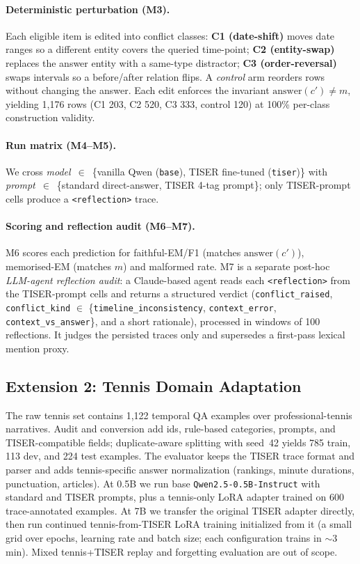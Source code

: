 \documentclass[conference]{IEEEtran}
\begin{document}
\paragraph{Deterministic perturbation (M3).}
Each eligible item is edited into conflict classes:
\textbf{C1 (date-shift)} moves date ranges so a different entity covers the queried time-point;
\textbf{C2 (entity-swap)} replaces the answer entity with a same-type distractor;
\textbf{C3 (order-reversal)} swaps intervals so a before/after relation flips.
A \emph{control} arm reorders rows without changing the answer. Each edit enforces the invariant $\text{answer}(c'){\neq}m$, yielding 1,176 rows (C1 203, C2 520, C3 333, control 120) at 100\% per-class construction validity.

\paragraph{Run matrix (M4--M5).}
We cross \emph{model}~$\in$~\{vanilla Qwen (\texttt{base}), TISER fine-tuned (\texttt{tiser})\} with \emph{prompt}~$\in$~\{standard direct-answer, TISER 4-tag prompt\}; only TISER-prompt cells produce a \texttt{<reflection>} trace.

\paragraph{Scoring and reflection audit (M6--M7).}
M6 scores each prediction for faithful-EM/F1 (matches $\text{answer}(c')$), memorised-EM (matches $m$) and malformed rate. M7 is a separate post-hoc \emph{LLM-agent reflection audit}: a Claude-based agent reads each \texttt{<reflection>} from the TISER-prompt cells and returns a structured verdict (\texttt{conflict\_raised}, \texttt{conflict\_kind} $\in$ \{\texttt{timeline\_inconsistency}, \texttt{context\_error}, \texttt{context\_vs\_answer}\}, and a short rationale), processed in windows of 100 reflections. It judges the persisted traces only and supersedes a first-pass lexical mention proxy.

\subsection{Extension 2: Tennis Domain Adaptation}

The raw tennis set contains 1,122 temporal QA examples over professional-tennis narratives. Audit and conversion add ids, rule-based categories, prompts, and TISER-compatible fields; duplicate-aware splitting with seed~42 yields 785 train, 113 dev, and 224 test examples. The evaluator keeps the TISER trace format and parser and adds tennis-specific answer normalization (rankings, minute durations, punctuation, articles). At 0.5B we run base \texttt{Qwen2.5-0.5B-Instruct} with standard and TISER prompts, plus a tennis-only LoRA adapter trained on 600 trace-annotated examples. At 7B we transfer the original TISER adapter directly, then run continued tennis-from-TISER LoRA training initialized from it (a small grid over epochs, learning rate and batch size; each configuration trains in ${\sim}3$\,min). Mixed tennis+TISER replay and forgetting evaluation are out of scope.
\end{document}
